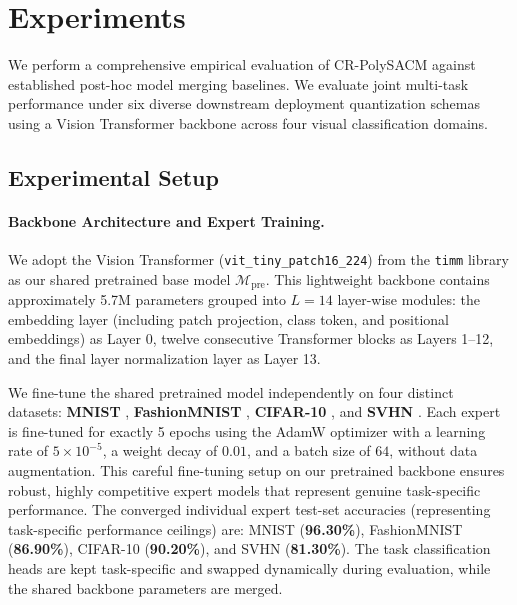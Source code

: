 \section{Experiments}
\label{sec:experiments}

We perform a comprehensive empirical evaluation of CR-PolySACM against established post-hoc model merging baselines. We evaluate joint multi-task performance under six diverse downstream deployment quantization schemas using a Vision Transformer backbone across four visual classification domains.

\subsection{Experimental Setup}
\paragraph{Backbone Architecture and Expert Training.} 
We adopt the Vision Transformer (\texttt{vit\_tiny\_patch16\_224}) \cite{vit} from the \texttt{timm} library \cite{timm} as our shared pretrained base model $\mathcal{M}_{\text{pre}}$. This lightweight backbone contains approximately 5.7M parameters grouped into $L=14$ layer-wise modules: the embedding layer (including patch projection, class token, and positional embeddings) as Layer 0, twelve consecutive Transformer blocks as Layers 1--12, and the final layer normalization layer as Layer 13.

We fine-tune the shared pretrained model independently on four distinct datasets: \textbf{MNIST} \cite{mnist}, \textbf{FashionMNIST} \cite{fashionmnist}, \textbf{CIFAR-10} \cite{cifar10}, and \textbf{SVHN} \cite{svhn}. Each expert is fine-tuned for exactly 5 epochs using the AdamW optimizer with a learning rate of $5 \times 10^{-5}$, a weight decay of $0.01$, and a batch size of $64$, without data augmentation. This careful fine-tuning setup on our pretrained backbone ensures robust, highly competitive expert models that represent genuine task-specific performance. The converged individual expert test-set accuracies (representing task-specific performance ceilings) are: MNIST (\textbf{96.30\%}), FashionMNIST (\textbf{86.90\%}), CIFAR-10 (\textbf{90.20\%}), and SVHN (\textbf{81.30\%}). The task classification heads are kept task-specific and swapped dynamically during evaluation, while the shared backbone parameters are merged.

